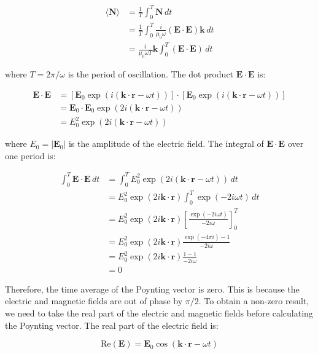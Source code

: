 \documentclass{article}
\begin{document}
\begin{align*}
\langle \mathbf{N} \rangle &= \frac{1}{T} \int_0^T \mathbf{N} \, dt \\
&= \frac{1}{T} \int_0^T \frac{i}{\mu_0 \omega} (\mathbf{E} \cdot \mathbf{E}) \mathbf{k} \, dt \\
&= \frac{i}{\mu_0 \omega T} \mathbf{k} \int_0^T (\mathbf{E} \cdot \mathbf{E}) \, dt
\end{align*}

where $T = 2\pi/\omega$ is the period of oscillation.  The dot product $\mathbf{E} \cdot \mathbf{E}$ is:

\begin{align*}
\mathbf{E} \cdot \mathbf{E} &= [\mathbf{E}_0 \exp(i (\mathbf{k} \cdot \mathbf{r} - \omega t))] \cdot [\mathbf{E}_0 \exp(i (\mathbf{k} \cdot \mathbf{r} - \omega t))] \\
&= \mathbf{E}_0 \cdot \mathbf{E}_0 \exp(2i (\mathbf{k} \cdot \mathbf{r} - \omega t)) \\
&= E_0^2 \exp(2i (\mathbf{k} \cdot \mathbf{r} - \omega t))
\end{align*}

where $E_0 = |\mathbf{E}_0|$ is the amplitude of the electric field.  The integral of $\mathbf{E} \cdot \mathbf{E}$ over one period is:

\begin{align*}
\int_0^T \mathbf{E} \cdot \mathbf{E} \, dt &= \int_0^T E_0^2 \exp(2i (\mathbf{k} \cdot \mathbf{r} - \omega t)) \, dt \\
&= E_0^2 \exp(2i \mathbf{k} \cdot \mathbf{r}) \int_0^T \exp(-2i \omega t) \, dt \\
&= E_0^2 \exp(2i \mathbf{k} \cdot \mathbf{r}) \left[ \frac{\exp(-2i \omega t)}{-2i \omega} \right]_0^T \\
&= E_0^2 \exp(2i \mathbf{k} \cdot \mathbf{r}) \frac{\exp(-4 \pi i) - 1}{-2i \omega} \\
&= E_0^2 \exp(2i \mathbf{k} \cdot \mathbf{r}) \frac{1 - 1}{-2i \omega} \\
&= 0
\end{align*}

Therefore, the time average of the Poynting vector is zero.  This is because the electric and magnetic fields are out of phase by $\pi/2$.  To obtain a non-zero result, we need to take the real part of the electric and magnetic fields before calculating the Poynting vector.  The real part of the electric field is:

\begin{equation*}
\text{Re}(\mathbf{E}) = \mathbf{E}_0 \cos(\mathbf{k} \cdot \mathbf{r} - \omega t)
\end{equation*}
\end{document}
